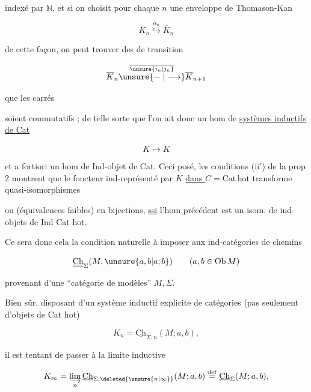 indexé par $\mathbb N$, et si  on choisit pour chaque $n$ une enveloppe de Thomason-Kan

\[
 K_n\overset{\alpha_n}{\hookrightarrow}\overline K_n
\]

de cette façon, on peut trouver des  de transition

\[
 \overline K_n\overset{\overline{\unsure{i_n|j_n}}}{\unsure{\relbar|\longrightarrow}}\overline K_{n+1}
\]

 que les carrés


soient commutatifs ; de telle sorte que l'on ait donc un hom de \uline{systèmes inductifs de Cat}

\[
 K\longrightarrow\overline K
\]

et a fortiori un hom de Ind-objet de Cat. Ceci posé, les conditions  (ii$'$) de la prop 2 montrent que le foncteur ind-représenté par $K$ \uline{dans $C=\mathrm{Cat\,hot}$}  transforme quasi-isomorphismes


ou  (équivalences faibles) en bijections, \uline{ssi} l'hom précédent est un isom. de ind-objets de Ind Cat hot.

Ce sera donc cela la condition naturelle à imposer aux  ind-catégories de chemins

\[
 \underline{\underline{\mathrm{Ch}}}_{\Sigma}(M,\unsure{a,b|a;b})
 \qquad(a,b\in\mathrm{Ob}\,M)
\]

provenant d'une ``catégorie de modèles'' $M,\Sigma$.

Bien sûr, disposant d'un système inductif explicite de catégories (pas seulement d'objets de Cat hot)

\[
 K_n=\underline{\mathrm{Ch}}_{\Sigma,n}(M;a,b),
\]

il est tentant de passer à la limite inductive

\[
 K_\infty=\varinjlim_n\underline{\mathrm{Ch}}_{\Sigma,\deleted{\unsure{n|\infty}}}(M;a,b)
 \overset{\mathrm{def}}{=}\underline{\mathrm{Ch}}_\Sigma(M;a,b),
\]

